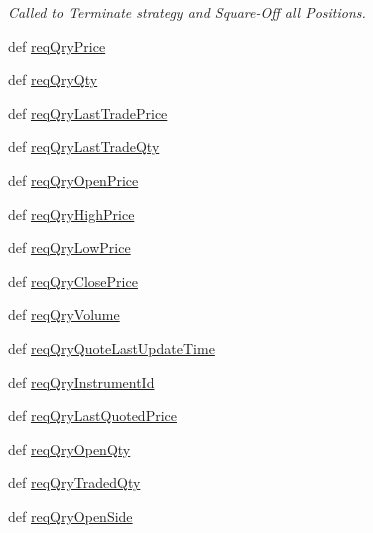 \begin{DoxyCompactItemize}
\begin{DoxyCompactList}\small\item\em Called to Terminate strategy and Square-\/\-Off all Positions. \end{DoxyCompactList}\item 
def \hyperlink{classmuTradePyBase_1_1CustomStrategy_a031e451622d3607fe0f99c17795d566d}{req\-Qry\-Price}
\item 
def \hyperlink{classmuTradePyBase_1_1CustomStrategy_a7ea60e547430b6610974707a3f45430d}{req\-Qry\-Qty}
\item 
def \hyperlink{classmuTradePyBase_1_1CustomStrategy_a1bd456257c3c2fdcb3ed0cd22f4c6f56}{req\-Qry\-Last\-Trade\-Price}
\item 
def \hyperlink{classmuTradePyBase_1_1CustomStrategy_ae3c193d85cc5646d9b00eedd947c7301}{req\-Qry\-Last\-Trade\-Qty}
\item 
def \hyperlink{classmuTradePyBase_1_1CustomStrategy_a43f7cda049e16a6a966c3547dd2a8b0e}{req\-Qry\-Open\-Price}
\item 
def \hyperlink{classmuTradePyBase_1_1CustomStrategy_a13df1f64c71be14f579815e938fffba2}{req\-Qry\-High\-Price}
\item 
def \hyperlink{classmuTradePyBase_1_1CustomStrategy_af73b78773ef2251fed7aa9f174fb2a76}{req\-Qry\-Low\-Price}
\item 
def \hyperlink{classmuTradePyBase_1_1CustomStrategy_a40d413bcd781c8375aa159e711902dbe}{req\-Qry\-Close\-Price}
\item 
def \hyperlink{classmuTradePyBase_1_1CustomStrategy_ab407c2c9c5a2465da0ac761d3191314b}{req\-Qry\-Volume}
\item 
def \hyperlink{classmuTradePyBase_1_1CustomStrategy_a93a925e3d1e1216103c8564eb07b9ae0}{req\-Qry\-Quote\-Last\-Update\-Time}
\item 
def \hyperlink{classmuTradePyBase_1_1CustomStrategy_ad300c984da4dfa01e2404afbb49252b3}{req\-Qry\-Instrument\-Id}
\item 
def \hyperlink{classmuTradePyBase_1_1CustomStrategy_aed341505e024c28a356bc933fdcd3d7f}{req\-Qry\-Last\-Quoted\-Price}
\item 
def \hyperlink{classmuTradePyBase_1_1CustomStrategy_aa3dea3c1de8b77262510f97841fe639c}{req\-Qry\-Open\-Qty}
\item 
def \hyperlink{classmuTradePyBase_1_1CustomStrategy_a58f6c1dc1cbad4adf97f76339ca0c349}{req\-Qry\-Traded\-Qty}
\item 
def \hyperlink{classmuTradePyBase_1_1CustomStrategy_aa378f72d5b382f297b119891feea7c24}{req\-Qry\-Open\-Side}

\end{DoxyCompactItemize}

